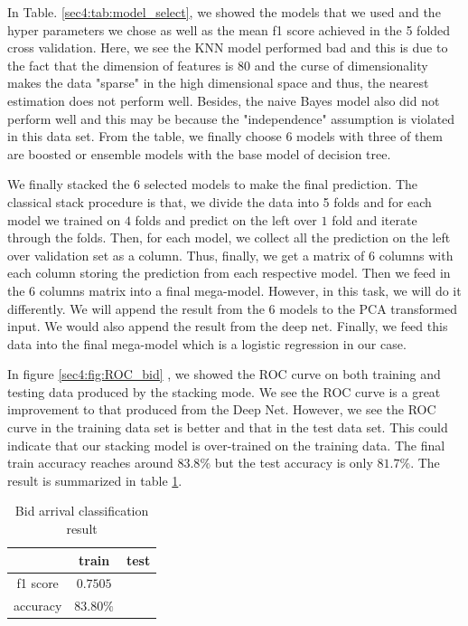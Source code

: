 \documentclass[letterpaper,12pt]{article}
\numberwithin{equation}{section}
\begin{document}
In Table. \ref{sec4:tab:model_select}, we showed the models that we used and the hyper parameters we chose as well as the mean f1 score achieved in the 5 folded cross validation. Here, we see the KNN model performed bad and this is due to the fact that the dimension of features is $80$ and the curse of dimensionality makes the data "sparse" in the high dimensional space and thus, the nearest estimation does not perform well. Besides, the naive Bayes model also did not perform well and this may be because the "independence" assumption is violated in this data set. From the table, we finally choose $6$ models with three of them are boosted or ensemble models with the base model of decision tree. 

We finally stacked the 6 selected models to make the final prediction. The classical stack procedure is that, we divide the data into 5 folds and for each model we trained on $4$ folds and predict on the left over $1$ fold and iterate through the folds. Then, for each model, we collect all the prediction on the left over validation set as a column. Thus, finally, we get a matrix of $6$ columns with each column storing the prediction from each respective model.  Then we feed in the $6$ columns matrix into a final mega-model. However, in this task, we will do it differently. We will append the result from the $6$ models to the PCA transformed input. We would also append the result from the deep net. Finally, we feed this data into the final mega-model which is a logistic regression in our case. 


In figure \ref{sec4:fig:ROC_bid} , we showed the ROC curve on both training and testing data produced by the stacking mode. We see the ROC curve is a great improvement to that produced from the Deep Net. However, we see the ROC curve in the training data set is better and that in the test data set. This could indicate that our stacking model is over-trained on the training data. The final train accuracy reaches around $83.8\%$ but the test accuracy is only $81.7\%$. The result is summarized in table \ref{sec4:tab:bid_result}.

\begin{table}[H]
    \centering
    \caption{Bid arrival classification result}
    \begin{tabular}{c c c}
       \hline \hline 
                 & train      & test     \\ \hline
        f1 score & $0.7505$   & \color{red}{$0.6990$}  \\ 
        accuracy & $83.80\%$  & \color{red}{$81.78\%$} \\ \hline \hline 
    \end{tabular}
    \label{sec4:tab:bid_result}
\end{table}
\end{document}
